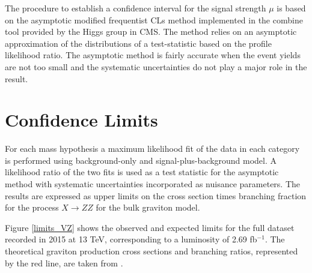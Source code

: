 The procedure to establish a confidence interval for the signal strength $\mu$ is based on the
asymptotic modified frequentist CLs method \cite{Cowan:2010js} implemented in the combine tool provided by the Higgs group in CMS. The method relies on an asymptotic approximation of the distributions of a test-statistic based on the profile likelihood ratio. The asymptotic method is fairly accurate when the event yields are not too small and the systematic uncertainties do not play a major role in the result.

\section{Confidence Limits}
For each mass hypothesis a maximum likelihood fit of the data in each category is performed using background-only and signal-plus-background model. A likelihood ratio of the two fits is used as a test statistic for the asymptotic method with systematic uncertainties incorporated as nuisance parameters. The results are expressed as upper limits on the cross section times branching fraction for the process $X \rightarrow ZZ$ for the bulk graviton model. 

Figure \ref{limits_VZ} shows the observed and expected limits for the full dataset recorded in 2015 at 13 TeV, corresponding to a luminosity of 2.69 fb$^{-1}$. The theoretical graviton production cross sections and branching ratios, represented by the red line, are taken from \cite{Oliveira:2014kla}.

